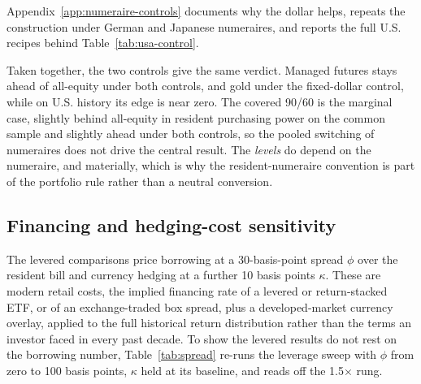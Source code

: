 \documentclass[11pt]{article}
\begin{document}
Appendix~\ref{app:numeraire-controls} documents why the dollar helps,
repeats the construction under German and Japanese numeraires, and reports the
full U.S. recipes behind Table~\ref{tab:usa-control}.

Taken together, the two controls give the same verdict. Managed futures stays
ahead of all-equity under both controls, and gold under the fixed-dollar
control, while on U.S. history its edge is near zero. The covered 90/60 is the
marginal case, slightly behind all-equity in resident purchasing power on the
common sample and slightly ahead under both controls, so the pooled switching
of numeraires does not drive the central result. The \emph{levels} do depend on
the numeraire, and materially, which is why the resident-numeraire convention
is part of the portfolio rule rather than a neutral conversion.


\subsection{Financing and hedging-cost sensitivity}
\label{sec:spread-sensitivity}

The levered comparisons price borrowing at a 30-basis-point spread $\phi$ over
the resident bill and currency hedging at a further 10 basis points $\kappa$.
These are modern retail costs, the implied financing rate of a levered or
return-stacked ETF, or of an exchange-traded box spread, plus a developed-market
currency overlay, applied to the full historical return distribution rather than
the terms an investor faced in every past decade. To show the levered results do
not rest on the borrowing number, Table~\ref{tab:spread} re-runs the leverage
sweep with $\phi$ from zero to 100 basis points, $\kappa$ held at its baseline,
and reads off the 1.5$\times$ rung.
\end{document}
